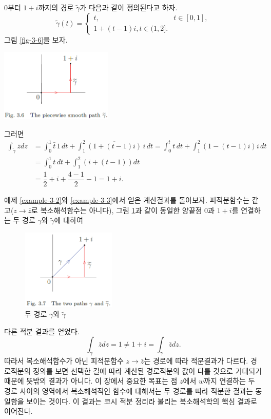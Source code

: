 \begin{saltexample}[label=example-3-3]{}{} %
$0$부터 $1+i$까지의 경로 $\tilde\gamma$가 다음과 같이 정의된다고 하자.
\[
\tilde\gamma(t) = \begin{cases}
t, & t\in[0,1], \\
1+(t-1)i, t\in (1,2].
\end{cases}
\]
그림 \ref{fig-3-6}을 보자.
\begin{center}
\includegraphics[width=0.4\textwidth]{./SaltChapter/fig-3-6}
\end{center}
\label{fig-3-6}
그러면
\begin{align*}
\int_{\tilde\gamma} \bar z dz 
&= \int_0^1 \bar t \,1\,dt
+ \int_1^2 \overline{(1+(t-1)i)}\,i\, dt
= \int_0^t t\,dt + \int_1^2 (1-(t-1)i)i\,dt \\
&= \int_0^1 t\,dt + \int_1^2 (i+(t-1))dt \\
&= \dfrac12 + i + \dfrac{4-1}2 - 1 = 1+ i.
\end{align*}
\end{saltexample}

예제 \ref{example-3-2}와 \ref{example-3-3}에서 얻은 계산결과를 돌아보자.
피적분함수는 같고($z\to\bar z$로 복소해석함수는 아니다),
그림 \ref{fig-3-7}과 같이
동일한 양끝점 $0$과 $1+i$를 연결하는 두 경로 $\gamma$와 $\tilde\gamma$에 대하여
\begin{figure}[!h]
\begin{center}
\includegraphics[width=0.4\textwidth]{./SaltChapter/fig-3-7}
\end{center}
\caption{두 경로 $\gamma$와 $\tilde\gamma$}
\label{fig-3-7}
\end{figure}
다른 적분 결과를 얻었다.
\[
\int_\gamma \bar z dz = 1 \ne 1+i = \int_{\tilde\gamma}\bar z dz.
\]
따라서 복소해석함수가 아닌 피적분함수 $z\to\bar z$는 경로에 따라 적분결과가 다르다.
경로적분의 정의를 보면
선택한 길에 따라 계산된 경로적분의 값이 다를 것으로 기대되기 때문에
뜻밖의 결과가 아니다.
이 장에서 중요한 목표는 
점 $z$에서 $w$까지 연결하는 두 경로 사이의 영역에서 복소해석적인 함수에 대해서는
두 경로를 따라 적분한 결과는 동일함을 보이는 것이다.
이 결과는 코시 적분 정리라 불리는 복소해석학의 핵심 결과로 이어진다.

